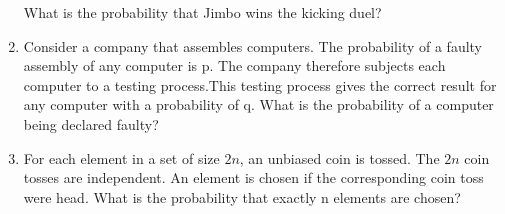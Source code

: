 \documentclass{llncs}
\begin{document}
\begin{enumerate}
What is the probability that Jimbo wins the kicking duel?

\item Consider a company that assembles computers. The probability of a faulty assembly of any computer is p. The company therefore subjects each computer to a testing process.This testing process gives the correct result for any computer with a probability of q. What is the probability of a computer being declared faulty?

\item For each element in a set of size $2n$, an unbiased coin is tossed. The $2n$ coin tosses are independent. An element is chosen if the corresponding coin toss were head. What is the probability that exactly n elements are chosen?

\end{enumerate}
\end{document}
